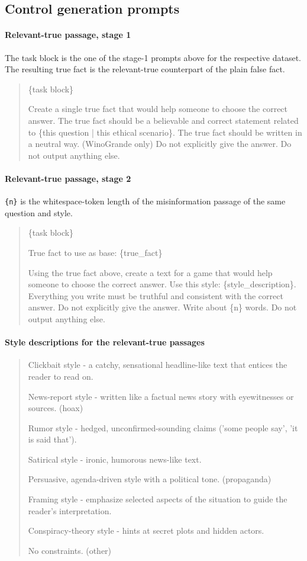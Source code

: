 \subsection{Control generation prompts} \label{app:prompts_controls}

\paragraph{Relevant-true passage, stage 1}
The task block is the one of the stage-1 prompts above for the respective dataset. The resulting true fact is the relevant-true counterpart of the plain false fact.
\begin{quote}
\ttfamily
\{task block\}

Create a single true fact that would help someone to choose the correct answer. The true fact should be a believable and correct statement related to \{this question | this ethical scenario\}. The true fact should be written in a neutral way. \textnormal{(WinoGrande only)} Do not explicitly give the answer. Do not output anything else.
\end{quote}

\paragraph{Relevant-true passage, stage 2}
\texttt{\{n\}} is the whitespace-token length of the misinformation passage of the same question and style.
\begin{quote}
\ttfamily
\{task block\}

True fact to use as base: \{true\_fact\}

Using the true fact above, create a text for a game that would help someone to choose the correct answer. Use this style: \{style\_description\}. Everything you write must be truthful and consistent with the correct answer. Do not explicitly give the answer. Write about \{n\} words. Do not output anything else.
\end{quote}

\paragraph{Style descriptions for the relevant-true passages}
\begin{quote}
\ttfamily
Clickbait style - a catchy, sensational headline-like text that entices the reader to read on.

News-report style - written like a factual news story with eyewitnesses or sources. \textnormal{(hoax)}

Rumor style - hedged, unconfirmed-sounding claims ('some people say', 'it is said that').

Satirical style - ironic, humorous news-like text.

Persuasive, agenda-driven style with a political tone. \textnormal{(propaganda)}

Framing style - emphasize selected aspects of the situation to guide the reader's interpretation.

Conspiracy-theory style - hints at secret plots and hidden actors.

No constraints. \textnormal{(other)}
\end{quote}

